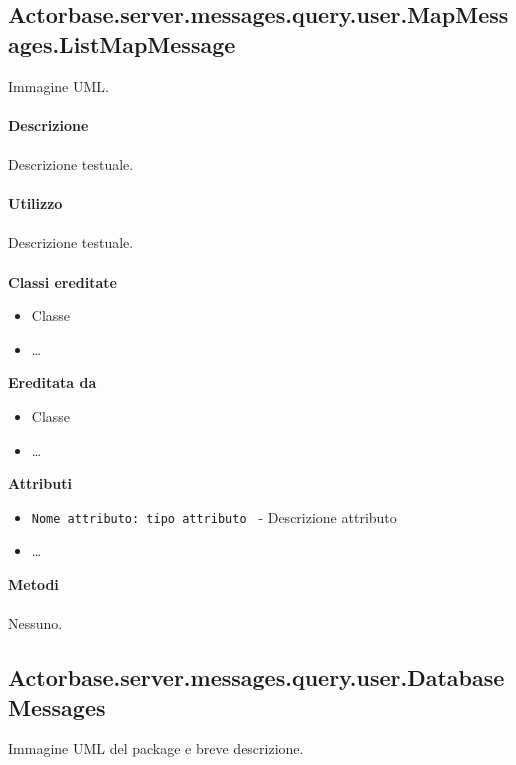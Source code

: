 \documentclass[a4paper]{article}
\begin{document}
	\subsection{Actorbase.server.messages.query.user.MapMessages.ListMapMessage}
		Immagine UML.
		\\ \\
		\textbf{Descrizione}
			\\ \\
			Descrizione testuale.
			\\ \\
		\textbf{Utilizzo}
			\\ \\
			Descrizione testuale.
			\\ \\
		\textbf{Classi ereditate}
			\begin{itemize}
				\item Classe
				\item \dots
			\end{itemize}
		\textbf{Ereditata da}
			\begin{itemize}
				\item Classe
				\item \dots
			\end{itemize}
		\textbf{Attributi}
			\begin{itemize}
				\item \texttt{Nome attributo: tipo attributo } - Descrizione attributo
				\item \dots
			\end{itemize}
		\textbf{Metodi}
			\\ \\
			Nessuno.
			
	\subsection{Actorbase.server.messages.query.user.DatabaseMessages}
		Immagine UML del package e breve descrizione.
		
\end{document}
